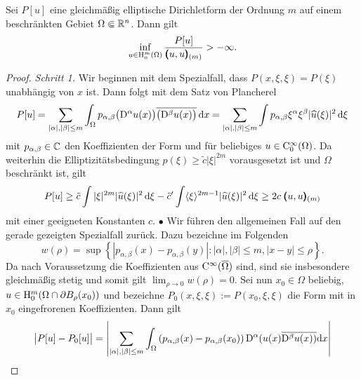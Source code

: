 \begin{thm}
Sei $P[u]$ eine gleichmäßig elliptische Dirichletform der Ordnung $m$ auf einem beschränkten Gebiet $\Omega\Subset\mathbb R^n$. Dann gilt
\begin{equation}
  \inf_{u\in\mathrm H_0^m(\Omega)} \frac{P[u]}{\pmb(u,u\pmb)_{(m)}} > -\infty.
\end{equation}
\end{thm}
\begin{proof}
{\sl Schritt 1.} Wir beginnen mit dem Spezialfall, dass $P(x,\xi,\xi) = P(\xi)$ unabhängig von $x$ ist. Dann folgt mit dem Satz von Plancherel
\begin{equation}
 P[u] =  \sum_{|\alpha|,|\beta|\le m} \int_\Omega  p_{\alpha,\beta} \big(\mathrm D^\alpha u(x)\big)\overline{\big(\mathrm D^\beta u(x)\big)} \,\mathrm d x
 =   \sum_{|\alpha|,|\beta|\le m} \int  p_{\alpha,\beta} \xi^\alpha \xi^\beta  |\widehat u(\xi)|^2 \,\mathrm d\xi 
\end{equation}
mit $p_{\alpha,\beta}\in\mathbb C$ den Koeffizienten der Form und für beliebiges $u\in\mathrm C_0^\infty(\Omega)$. Da weiterhin die Elliptizitätsbedingung $p(\xi)\ge \tilde c |\xi|^{2m}$ 
vorausgesetzt ist und $\Omega$ beschränkt ist, gilt
\begin{equation}
  P[u] \ge \tilde c \int |\xi|^{2m} |\widehat u(\xi)|^2 \,\mathrm d\xi  -  \tilde c' \int \langle \xi\rangle^{2m-1} |\widehat u(\xi)|^2 \,\mathrm d\xi  \ge  2c\; \pmb(u,u\pmb)_{(m)}
\end{equation}
mit einer geeigneten Konstanten $c$. $\bullet$  Wir führen den allgemeinen Fall auf den gerade gezeigten Spezialfall zurück. Dazu bezeichne im Folgenden
\begin{equation}
	w(\rho) = \sup\left\{| p_{\alpha,\beta}(x)-p_{\alpha,\beta}(y)| : |\alpha|, |\beta| \le m, | x-y| \le \rho\right\}.
\end{equation} 
Da nach Voraussetzung die Koeffizienten aus $\mathrm C^\infty(\overline\Omega)$ sind, sind sie insbesondere gleichmäßig stetig und somit gilt
$\lim_{\rho\to0} w(\rho)=0$.  Sei nun $x_0\in \Omega$ beliebig, $u\in \mathrm H_0^m(\Omega\cap \partial B_\rho(x_0))$ und bezeichne $P_0(x,\xi, \xi):=P(x_0,\xi,\xi)$ die Form mit in $x_0$ eingefrorenen Koeffizienten. Dann gilt
\begin{equation}
\begin{split}
\big| P[u]-P_0[u] \big| &=\left| \sum\limits_{|\alpha|, |\beta| \le m} \int_\Omega \left(p_{\alpha,\beta}(x)-p_{\alpha,\beta}(x_0)\right){\D^\alpha(u(x)}\overline{\D^\beta u(x))}\mathrm{d}x\right|\\

\end{split}
\end{equation}
\end{proof}
